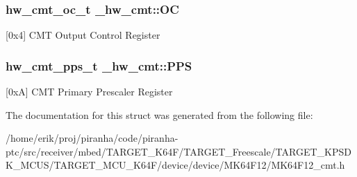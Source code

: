 \subsubsection[{\texorpdfstring{OC}{OC}}]{ {\bf hw\+\_\+cmt\+\_\+oc\+\_\+t} \+\_\+hw\+\_\+cmt\+::\+OC}\hypertarget{struct__hw__cmt_a2e733906f9aa3d944a7a7e431f25fd93}{}\label{struct__hw__cmt_a2e733906f9aa3d944a7a7e431f25fd93}
\mbox{[}0x4\mbox{]} C\+MT Output Control Register 
\subsubsection[{\texorpdfstring{P\+PS}{PPS}}]{ {\bf hw\+\_\+cmt\+\_\+pps\+\_\+t} \+\_\+hw\+\_\+cmt\+::\+P\+PS}\hypertarget{struct__hw__cmt_ad4236f7458e8f2e5637e3fb35d41fdb5}{}\label{struct__hw__cmt_ad4236f7458e8f2e5637e3fb35d41fdb5}
\mbox{[}0xA\mbox{]} C\+MT Primary Prescaler Register 

The documentation for this struct was generated from the following file\+:\begin{DoxyCompactItemize}
\item 
/home/erik/proj/piranha/code/piranha-\/ptc/src/receiver/mbed/\+T\+A\+R\+G\+E\+T\+\_\+\+K64\+F/\+T\+A\+R\+G\+E\+T\+\_\+\+Freescale/\+T\+A\+R\+G\+E\+T\+\_\+\+K\+P\+S\+D\+K\+\_\+\+M\+C\+U\+S/\+T\+A\+R\+G\+E\+T\+\_\+\+M\+C\+U\+\_\+\+K64\+F/device/device/\+M\+K64\+F12/M\+K64\+F12\+\_\+cmt.\+h\end{DoxyCompactItemize}
